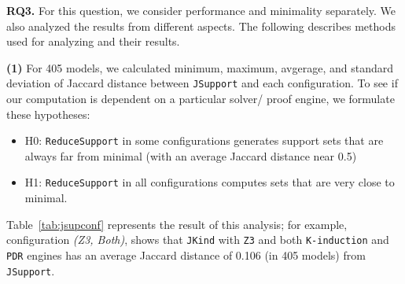 
\vspace{6pt}
\noindent{}
 \vspace{9pt}

\textbf{RQ3.}   For this question, we consider performance and minimality separately.  We also analyzed the results from different aspects. The following describes methods used for analyzing and their results.

\textbf{(1)} For 405 models, we calculated minimum, maximum, avgerage, and standard deviation of Jaccard distance between \texttt{JSupport} and each configuration. To see if our computation is dependent on a particular solver/ proof engine, we formulate these hypotheses:
\begin{itemize}
  \item H0: \texttt{ReduceSupport} in some configurations generates support sets that are always far from minimal (with an average Jaccard distance near 0.5)
  \item H1: \texttt{ReduceSupport} in all configurations computes sets that are very close to minimal.
\end{itemize}
 
Table~\ref{tab:jsupconf} represents the result of this analysis; for example, configuration \emph{(Z3, Both)}, shows that \texttt{JKind} with \texttt{Z3} and both \texttt{K-induction} and \texttt{PDR} engines has an average Jaccard distance of 0.106 (in 405 models) from \texttt{JSupport}.


